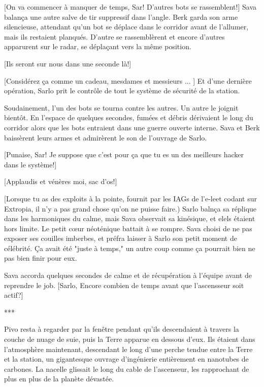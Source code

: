 [On va commencer à manquer de temps, Sar! D'autres bots se rassemblent!] Sava balança une autre salve de tir suppressif dans l'angle. Berk garda son arme silencieuse, attendant qu'un bot se déplace dans le corridor avant de l'allumer, mais ils restaient planqués. D'autre se rassemblèrent et encore d'autres apparurent sur le radar, se déplaçant vers la même position. 

[Ils seront sur nous dans une seconde là!] 

[Considérez ça comme un cadeau, mesdames et messieurs ... ] Et d'une dernière opération, Sarlo prit le contrôle de tout le système de sécurité de la station. 

Soudainement, l'un des bots se tourna contre les autres. Un autre le joignit bientôt. En l'espace de quelques secondes, fumées et débris dérivaient le long du corridor alors que les bots entraient dans une guerre ouverte interne. Sava et Berk baissèrent leurs armes et admirèrent le son de l'ouvrage de Sarlo. 

[Punaise, Sar! Je suppose que c'est pour ça que tu es un des meilleurs hacker dans le système!] 

[Applaudis et vénères moi, sac d'os!] 

[Lorsque tu as des exploits à la pointe, fournit par les IAGs de l'e-leet codant sur Extropia, il n'y a pas grand chose qu'on ne puisse faire.) Sarlo balnça sa réplique dans les harmoniques du calme, mais Sava observait sa kinésique, et elels étaient hors limite. Le petit cœur néoténique battait à se rompre. Sava choisi de ne pas exposer ses couilles imberbes, et préfra laisser à Sarlo son petit moment de célébrité. Ça avait été "juste à temps," un autre coup comme ça pourrait bien ne pas bien finir pour eux. 

Sava accorda quelques secondes de calme et de récupération à l'équipe avant de reprendre le job. [Sarlo, Encore combien de temps avant que l'ascensseur soit actif?] 

\begin{center} *** \end{center} 

Pivo resta à regarder par la fenêtre pendant qu'ils descendaient à travers la couche de nuage de suie, puis la Terre apparue en dessous d'eux. Ils étaient dans l'atmosphère maintenant, descendant le long d'une perche tendue entre la Terre et la station, un gigantesque ouvrage d'ingénierie entièrement en nanotubes de carbones. La nacelle glissait le long du cable de l'ascenseur, les rapprochant de plus en plus de la planète dévastée. 

